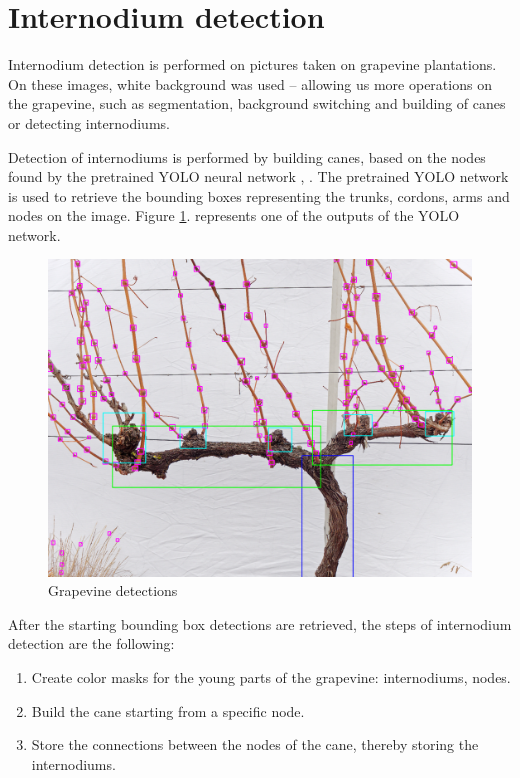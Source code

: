 \documentclass{PSAIE}%
\begin{document}
\section{Internodium detection} \label{sec_internodium_detection}
Internodium detection is performed on pictures taken on grapevine plantations. On these images, white
background was used -- allowing us more operations on the grapevine, such as segmentation, background
switching and building of canes or detecting internodiums.

Detection of internodiums is performed by building canes, based on the nodes found by the pretrained YOLO
neural network \cite{bolyki_2021}, \cite{glenn_jocher_2021_5563715}. The pretrained YOLO network is used
to retrieve the bounding boxes representing the trunks, cordons, arms and nodes on the image. Figure
\ref{fig_grapevine_YOLO}. represents one of the outputs of the YOLO network.

\begin{figure}[h]
      \centering
      \includegraphics[scale=0.28]{images/grapevine_yolo.png}
      \caption{Grapevine detections \cite{hellman2003grapevine}}
      \label{fig_grapevine_YOLO}
\end{figure}

After the starting bounding box detections are retrieved, the steps of internodium detection are the following:

\begin{enumerate}
      \item Create color masks for the young parts of the grapevine: internodiums, nodes.
      \item Build the cane starting from a specific node.
      \item Store the connections between the nodes of the cane, thereby storing the internodiums.
\end{enumerate}
\end{document}
